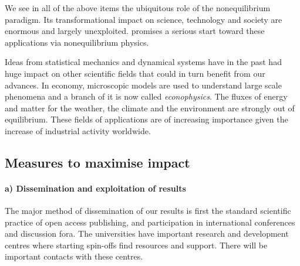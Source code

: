 We see in all of the above items the ubiquitous role of the nonequilibrium paradigm. Its
transformational impact on science, technology and society are enormous and largely
unexploited. \TheProject promises a serious start toward these applications via
nonequilibrium physics.

Ideas from statistical mechanics and dynamical systems have in the past had huge impact on
other scientific fields that could in turn benefit from our advances.
%
In economy, microscopic models are used to understand large scale phenomena and a branch of
it is now called {\em econophysics}.
%
The fluxes of energy and matter for the weather, the climate and the environment are
strongly out of equilibrium. These fields of applications are of increasing importance given
the increase of industrial activity worldwide.

\subsection{Measures to maximise impact}

\paragraph{a) Dissemination and exploitation of results}

The major method of dissemination of our results is first the standard scientific practice
of open access publishing, and participation in international conferences and discussion
fora. The universities have important research and development centres where starting
spin-offs find resources and support.
%
There will be important contacts with these centres.

